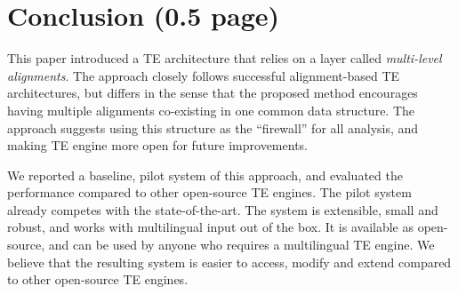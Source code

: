 \documentclass[11pt,letterpaper]{article}
\begin{document}
\section{Conclusion (0.5 page)}
This paper introduced a TE architecture that relies on a layer called
{\em multi-level alignments}. The approach closely follows successful  
alignment-based TE architectures, but differs in the sense that the
proposed method encourages having multiple alignments co-existing in 
one common data structure. The approach suggests using this structure
as the ``firewall'' for all analysis, and making TE engine more open
for future improvements.

We reported a baseline, pilot system of this approach, and evaluated
the performance compared to other open-source TE engines. The pilot
system already competes with the state-of-the-art. The system is
extensible, small and robust, and works with multilingual input out of
the box. It is available as open-source, and can be used by 
anyone who requires a multilingual TE engine. We believe that the 
resulting system is easier to access, modify and extend compared to
other open-source TE engines.




\end{document}
